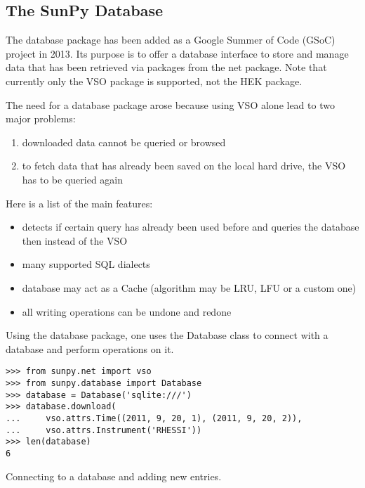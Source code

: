 \subsection{The SunPy Database}
The database package has been added as a Google Summer of Code (GSoC) project
in 2013. Its purpose is to offer a database interface to store and manage data
that has been retrieved via packages from the net package. Note that currently
only the VSO package is supported, not the HEK package.

The need for a database package arose because using VSO alone lead to two major
problems:
\begin{enumerate}
  \item downloaded data cannot be queried or browsed
  \item to fetch data that has already been saved on the local hard drive,
    the VSO has to be queried again
\end{enumerate}

Here is a list of the main features:
\begin{itemize}
  \item detects if certain query has already been used before and queries
    the database then instead of the VSO
  \item many supported SQL dialects
  \item database may act as a Cache (algorithm may be LRU, LFU or a custom one)
  \item all writing operations can be undone and redone
\end{itemize}

Using the database package, one uses the Database class to connect with a
database and perform operations on it.

\begin{listing}
\begin{verbatim}
>>> from sunpy.net import vso
>>> from sunpy.database import Database
>>> database = Database('sqlite:///')
>>> database.download(
...     vso.attrs.Time((2011, 9, 20, 1), (2011, 9, 20, 2)),
...     vso.attrs.Instrument('RHESSI'))
>>> len(database)
6
\end{verbatim}
\caption{Connecting to a database and adding new entries.}
\label{code:db_1}
\end{listing}


